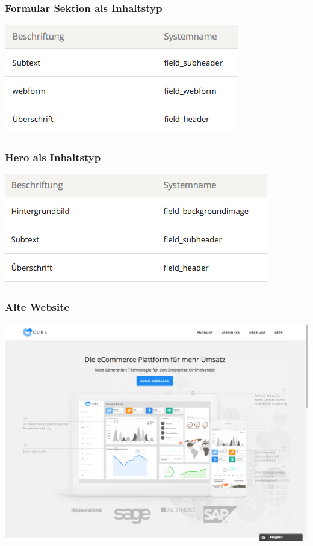 \documentclass[11pt,a4paper]{article}
\begin{document}
\begin{appendices}
\subsubsection*{Formular Sektion als Inhaltstyp}
\includegraphics[scale=0.5]{Form}
\subsubsection*{Hero als Inhaltstyp}
\includegraphics[scale=0.5]{Hero}
\subsubsection{Alte Website}
\includegraphics[scale=0.3]{getcore}

\end{appendices}
\end{document}
